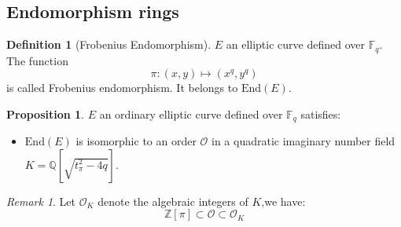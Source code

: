 \documentclass[10pt,a4paper]{beamer}
\theoremstyle{plain}
\theoremstyle{definition}
\theoremstyle{definition}
\theoremstyle{definition}
\newtheorem{prop}[thm]{Proposition}
\theoremstyle{definition}
\newtheorem{defi}[thm]{Definition}
\theoremstyle{remark}
\newtheorem{rem}[thm]{Remark}
\theoremstyle{remark}
\begin{document}
%


\begin{frame}
\section{Endomorphism rings}

\begin{defi}[Frobenius Endomorphism]
$E$ an elliptic curve defined over $\mathbb{F}_q$. The function \[ \pi:(x,y) \mapsto (x^q,y^q)\] is called Frobenius endomorphism. It belongs to $\mathrm{End}(E)$.
\end{defi}

\begin{prop} \label{prop:p-tor}
$E$ an ordinary elliptic curve defined over $\mathbb{F}_q$ satisfies:
\begin{itemize}
\item  $\mathrm{End}(E)$ is isomorphic to an order $\mathcal{O}$ in a quadratic imaginary number field $K=\mathbb{Q}[\sqrt{t_{\pi}^2-4q}]$.
\end{itemize}
\end{prop}


\begin{rem}
Let $\mathcal{O}_K$ denote the algebraic integers of $K$,we have:
\[ \mathbb{Z}[\pi] \subset \mathcal{O} \subset \mathcal{O}_K \]
\end{rem}


\end{frame}

%
%
\end{document}
